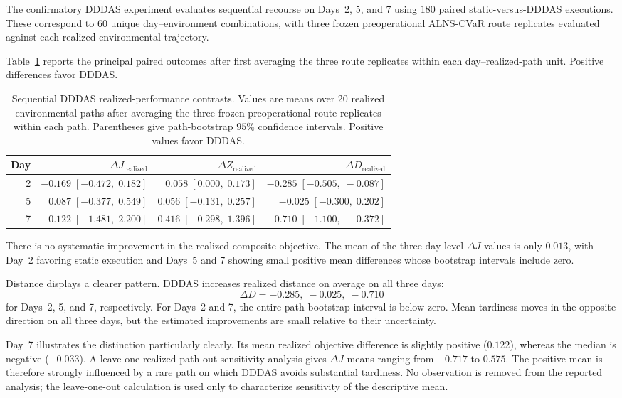 \documentclass[preprint,12pt]{elsarticle}
\newcommand{\1}{\mathbf{1}}
\begin{document}
The confirmatory DDDAS experiment evaluates sequential recourse on Days~2, 5,
and 7 using $180$ paired static-versus-DDDAS executions.
These correspond to $60$ unique day--environment combinations, with three
frozen preoperational ALNS-CVaR route replicates evaluated against each
realized environmental trajectory.

Table~\ref{tab:dddas_scientific} reports the principal paired outcomes after
first averaging the three route replicates within each day--realized-path unit.
Positive differences favor DDDAS.

\begin{table}[t]
	\centering
	\caption{Sequential DDDAS realized-performance contrasts. Values are means over
		20 realized environmental paths after averaging the three frozen
		preoperational-route replicates within each path. Parentheses give
		path-bootstrap $95\%$ confidence intervals. Positive values favor DDDAS.}
	\label{tab:dddas_scientific}
		\footnotesize
	\begin{tabular}{rrrr}
		\toprule
		Day &
		$\Delta J_{\mathrm{realized}}$ &
		$\Delta Z_{\mathrm{realized}}$ &
		$\Delta D_{\mathrm{realized}}$ \\
		\midrule
		2 &
		$-0.169\;[-0.472,\;0.182]$ &
		$ 0.058\;[0.000,\;0.173]$ &
		$-0.285\;[-0.505,\;-0.087]$ \\
		5 &
		$ 0.087\;[-0.377,\;0.549]$ &
		$ 0.056\;[-0.131,\;0.257]$ &
		$-0.025\;[-0.300,\;0.202]$ \\
		7 &
		$ 0.122\;[-1.481,\;2.200]$ &
		$ 0.416\;[-0.298,\;1.396]$ &
		$-0.710\;[-1.100,\;-0.372]$ \\
		\bottomrule
	\end{tabular}
\end{table}

There is no systematic improvement in the realized composite objective.
The mean of the three day-level $\Delta J$ values is only $0.013$, with
Day~2 favoring static execution and Days~5 and 7 showing small positive mean
differences whose bootstrap intervals include zero.

Distance displays a clearer pattern.
DDDAS increases realized distance on average on all three days:
\[
\Delta D
=
-0.285,\;-0.025,\;-0.710
\]
for Days~2, 5, and 7, respectively.
For Days~2 and 7, the entire path-bootstrap interval is below zero.
Mean tardiness moves in the opposite direction on all three days, but the
estimated improvements are small relative to their uncertainty.

Day~7 illustrates the distinction particularly clearly.
Its mean realized objective difference is slightly positive
($0.122$), whereas the median is negative ($-0.033$).
A leave-one-realized-path-out sensitivity analysis gives
$\Delta J$ means ranging from $-0.717$ to $0.575$.
The positive mean is therefore strongly influenced by a rare path on which
DDDAS avoids substantial tardiness. No observation is removed from the reported
analysis; the leave-one-out calculation is used only to characterize
sensitivity of the descriptive mean.
\end{document}
